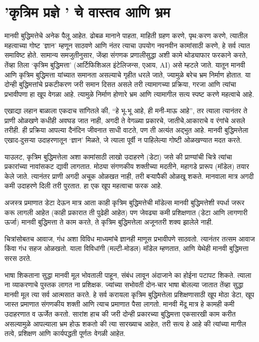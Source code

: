 \chapter{'कृत्रिम प्रज्ञे ' चे वास्तव आणि भ्रम}

मानवी बुद्धिमत्तेचे अनेक पैलू आहेत. ढोबळ मानाने पाहता, माहिती ग्रहण करणे, पृथ:करण करणे, त्यातील महत्वाच्या गोष्ट 'ज्ञान' म्हणून साठवणे आणि नंतर त्याचा उपयोग नवनवीन कामांसाठी करणे, हे सर्व त्यात समाविष्ट होते. सामान्य समजुतीनुसार, जेंव्हा संगणक प्रणालीसुद्धा अशी कामे थोड्याफार फरकाने करते, तेंव्हा तिला ‘कृत्रिम बुद्धिमत्ता’ (आर्टिफिशिअल इंटेलिजन्स, एआय, AI) असे म्हटले जाते. यातून मानवी आणि कृत्रिम बुद्धिमत्ता यांच्यात समानता असल्याचे गृहीत धरले जाते, ज्यामुळे बरेच भ्रम निर्माण होतात. या दोन्ही बुद्धिमत्तांचे प्रकटीकरण जरी समान दिसत असले तरी त्यामागच्या प्रक्रिया, गरजा आणि त्यांचा प्रभावीपणा हा खूप वेगळा आहे. त्यामुळे निर्माण होणारे भ्रम आणि त्यामागील सत्य स्पष्ट करणे महत्वाचे आहे.

एखाद्या लहान बाळाला एकदाच सांगितले की, “हे भू-भू आहे, ही मनी-माऊ आहे”, तर त्याला त्यानंतर ते प्राणी ओळखणे कधीही अवघड जात नाही, अगदी ते वेगळ्या प्रकारचे, जातीचे,आकाराचे व रंगांचे असले तरीही. ही प्रक्रिया आपल्या दैनंदिन जीवनात साधी वाटते, पण ती अत्यंत अद्भुत आहे. मानवी बुद्धिमत्तेला एखाद-दुसऱ्या उदाहरणातून ‘ज्ञान’ मिळते, जे त्याला पूर्वी न पाहिलेल्या गोष्टी ओळखण्यात मदत करते.

याउलट, कृत्रिम बुद्धिमत्तेला अशा कामांसाठी लाखो उदाहरणे (डेटा) जसे की प्राण्यांची चित्रे त्यांचा प्रकारांच्या नावांसकट द्यावी लागतात. मोठ्या संगणकीय शक्तीच्या मदतीने, महागडे प्रारूप (मॉडेल) तयार केले जाते. त्यानंतर प्राणी अगदी अचूक ओळखत नाही, तरी बऱ्यापैकी ओळखू शकते. मानवाला मात्र अगदी कमी उदाहरणे दिली तरी पुरतात. हा एक खूप महत्वाचा फरक आहे. 

अजस्त्र प्रमाणात डेटा देऊन मात्र आता काही कृत्रिम बुद्धिमत्तेची मॉडेल्स मानवी बुद्धिमत्तेशी स्पर्धा जरूर करू लागली आहेत (काही प्रकारात ती पुढेही आहेत) पण जेवढ्या कमी प्रशिक्षणात (डेटा आणि लागणारी ऊर्जा) मानवी बुद्धिमत्ता ते काम करते, ते कृत्रिम बुद्धिमत्तेला अजूनतरी शक्य झालेले नाही. 

चित्रांसोबतच आवाज, गंध अशा विविध माध्यमांचे ज्ञानही माणूस प्रभावीपणे साठवतो. त्यानंतर तत्सम आवाज किंवा गंध सहज ओळखतो. याला विविधांगी (मल्टी-मोडल) मॉडेल म्हणतात, आणि येथेही मानवी बुद्धिमत्ता सरस ठरते.

भाषा शिकताना सुद्धा मानवी मूल भोवताली पाहून, संबंध लावून अंदाजाने का होईना पटापट शिकते. त्याला ना व्याकरणाचे पुस्तक लागत ना प्रशिक्षक. ज्यांच्या सभोवती दोन-चार भाषा बोलल्या जातात तेंव्हा सुद्धा मानवी मूल त्या सर्व आत्मसात करते. हे सर्व करायला कृत्रिम बुद्धिमत्तेला प्रशिक्षणासाठी खूप मोठा डेटा, खूप जास्त प्रमाणात संगणकीय शक्ती आणि त्याच प्रमाणात पैसा लागतो. मानवी मेंदू मात्र हे कामही कमी उदाहरणात व ऊर्जेत करतो. सारांश हाच की  जरी दोन्ही प्रकारच्या बुद्धिमत्ता एकसारखी काम करीत असल्यामुळे आपल्याला भ्रम होऊ शकतो की त्या सारख्याच आहेत, तरी सत्य हे आहे की त्यांच्या मागील तत्वे, प्रशिक्षण आणि कार्यपद्धती पूर्णतः वेगळी आहेत. 

